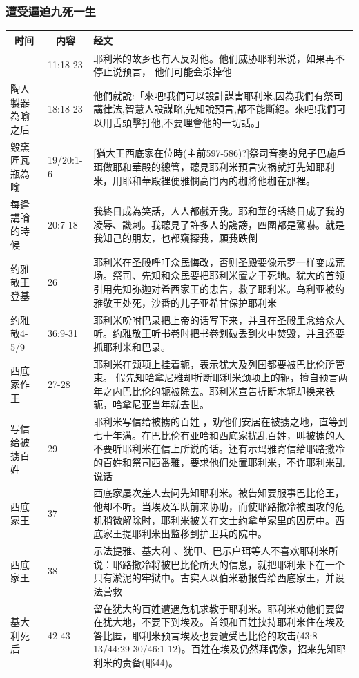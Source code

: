 \subsubsection{遭受逼迫九死一生}
\begin{table}[H]
\centering
\begin{tabular}{p{1.5cm}|p{1.40cm}|p{14cm}}\hline\hline
\multicolumn{1}{c|}{时间}&\multicolumn{1}{c|}{内容}&经文\\\hline
&11:18-23&耶利米的故乡也有人反对他。他们威胁耶利米说，如果再不停止说预言， 他们可能会杀掉他\\\hline
陶人製器為喻之后&18:18-23&他們就說:「來吧!我們可以設計謀害耶利米,因為我們有祭司講律法,智慧人設謀略,先知說預言,都不能斷絕。來吧!我們可以用舌頭擊打他,不要理會他的一切話。」\\\hline
毀窯匠瓦瓶為喻&19/20:1-6&[猶大王西底家在位時(主前597-586)?]祭司音麥的兒子巴施戶珥做耶和華殿的總管，聽見耶利米預言灾祸就打先知耶利米，用耶和華殿裡便雅憫高門內的枷將他枷在那裡。\\\hline
每逢講論的時候&20:7-18&我終日成為笑話，人人都戲弄我。耶和華的話終日成了我的凌辱、譏刺。我聽見了許多人的讒謗，四圍都是驚嚇。就是我知己的朋友，也都窺探我，願我跌倒\\\hline
约雅敬王登基&26&耶利米在圣殿呼吁众民悔改，否则圣殿要像示罗一样变成荒场。祭司、先知和众民要把耶利米置之于死地。犹大的首领引用先知弥迦对希西家王的忠告，救了耶利米。乌利亚被约雅敬王处死，沙番的儿子亚希甘保护耶利米\\\hline
约雅敬4-5/9&36:9-31&耶利米吩咐巴录把上帝的话写下来，并且在圣殿里念给众人听。约雅敬王听书卷时把书卷划破丢到火中焚毁，并且还要抓耶利米和巴录。\\\hline
西底家作王&27-28&耶利米在颈项上挂着轭，表示犹大及列国都要被巴比伦所管束。 假先知哈拿尼雅却折断耶利米颈项上的轭，擅自预言两年之内巴比伦的轭被除去。耶利米宣告折断木轭却换来铁轭，哈拿尼亚当年就去世。\\\hline
写信给被掳百姓&29&耶利米写信给被掳的百姓 ，劝他们安居在被掳之地，直等到七十年满。在巴比伦有亚哈和西底家扰乱百姓，叫被掳的人不要听耶利米在信上所说的话。还有示玛雅寄信给耶路撒冷的百姓和祭司西番雅，要求他们处置耶利米，不许耶利米乱说话\\\hline
西底家王&37&西底家屡次差人去问先知耶利米。被告知要服事巴比伦王，他却不听。当埃及军队前来协助，而使耶路撒冷被围攻的危机稍微解除时，耶利米被关在文士约拿单家里的囚房中。西底家王提耶利米出监移到护卫兵的院中。\\\hline
西底家王&38&示法提雅、基大利 、犹甲、巴示户珥等人不喜欢耶利米所说：耶路撒冷将被巴比伦所灭的信息，就把耶利米下在一个只有淤泥的牢狱中。古实人以伯米勒报告给西底家王，并设法营救\\\hline
基大利死后&42-43&留在犹大的百姓遭遇危机求教于耶利米。耶利米劝他们要留在犹大地，不要下到埃及。首领和百姓挟持耶利米住在埃及答比匿，耶利米预言埃及也要遭受巴比伦的攻击(43:8-13/44:29-30/46:1-12)。百姓在埃及仍然拜偶像，招来先知耶利米的责备(耶44)。\\\hline
\end{tabular}
\end{table}



